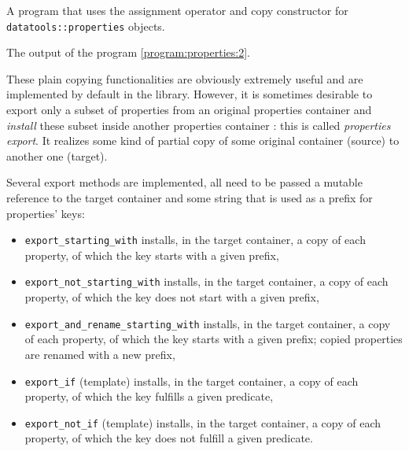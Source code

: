 \begin{program}[h]
\caption{A program that uses the assignment operator and copy constructor
for  \texttt{datatools::properties} objects.}
\label{program:properties:2}
\end{program}

\begin{sample}[h]
\caption{The output of the program \ref{program:properties:2}.}
\label{sample:properties:2}
\end{sample}

These plain copying functionalities are obviously extremely useful and
are implemented  by default in  the library. However, it  is sometimes
desirable  to export  only a  subset  of properties  from an  original
properties  container and \emph{install}  these subset  inside another
properties container : this  is called \emph{properties export}. It
realizes some kind of partial  copy of some original container (source)
to another one (target).

Several  export methods  are  implemented,  all need  to  be passed  a
mutable reference to  the target container and  some string that is  used as a
prefix for properties' keys:

\begin{itemize}

\item   \texttt{export\_starting\_with}   installs,   in   the   target
  container, a copy  of each property, of which the  key starts with a
  given prefix,

\item  \texttt{export\_not\_starting\_with}  installs,  in  the  target
  container, a copy of each property,  of which the key does not start
  with a given prefix,

\item  \texttt{export\_and\_rename\_starting\_with}  installs,  in  the
  target container, a  copy of each property, of  which the key starts
  with  a given  prefix;  copied  properties are  renamed  with a  new
  prefix,

\item \texttt{export\_if} (template) installs, in the target container,
  a  copy  of  each  property,  of  which the  key  fulfills  a  given
  predicate,

\item  \texttt{export\_not\_if}  (template)  installs,  in  the  target
  container,  a copy  of  each property,  of  which the  key does  not
  fulfill a given predicate.

\end{itemize}

